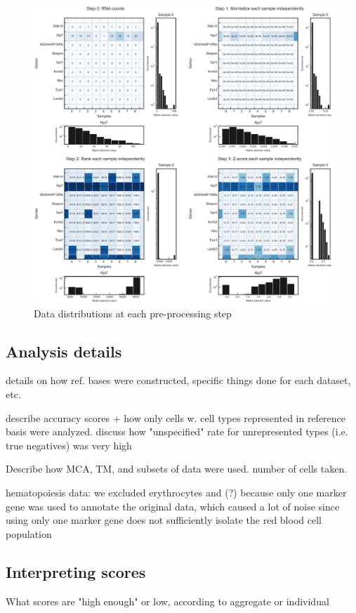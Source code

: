 \documentclass[aps,superscriptaddress, notitlepage,longbibliography]{revtex4-1}
\begin{document}
\begin{figure}
	\centering
		\includegraphics[scale=0.6]{figs/fig1a supplement.pdf}
	\caption{Data distributions at each pre-processing step}
	\label{FIG:supp1}
\end{figure}

\subsection{Analysis details}
details on how ref. bases were constructed, specific things done for each dataset, etc.

describe accuracy scores + how only cells w. cell types represented in reference basis were analyzed. discuss how "unspecified" rate for unrepresented types (i.e. true negatives) was very high

Describe how MCA, TM, and subsets of data were used. number of cells taken. 

hematopoiesis data: we excluded erythrocytes and (?) because only one marker gene was used to annotate the original data, which caused a lot of noise since using only one marker gene does not sufficiently isolate the red blood cell population

\subsection{Interpreting scores}
What scores are "high enough" or low, according to aggregate or individual
\end{document}
